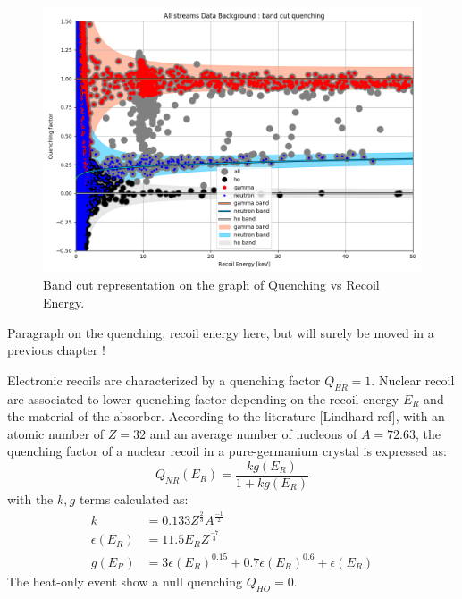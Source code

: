 \begin{figure}
\centering
\includegraphics[width=\linewidth,]{Figures/Neutron/band_cut_quenching.png}
\caption{Band cut representation on the graph of Quenching vs Recoil Energy.}
\label{fig:band-cut-quenching}
\end{figure}

{\color{red} Paragraph on the quenching, recoil energy here, but will surely be moved in a previous chapter !}

Electronic recoils are characterized by a quenching factor $Q_{ER}=1$. Nuclear recoil are associated to lower quenching factor depending on the recoil energy $E_R$ and the material of the absorber. According to the literature [Lindhard ref], with an atomic number of $Z=32$ and an average number of nucleons of $A=72.63$, the quenching factor of a nuclear recoil in a pure-germanium crystal is expressed as:
\begin{equation}
\label{eq:lindhard}
	Q_{NR}(E_R) = \frac{k g(E_R)}{1+k g(E_R)}
\end{equation}
with the $k,g$ terms calculated as:
\begin{align}
	k &= 0.133 Z^\frac{2}{3} A^\frac{-1}{2} \\
	\epsilon(E_R) &= 11.5 E_R Z^\frac{-7}{3} \\
	g(E_R) &= 3 \epsilon(E_R)^{0.15} + 0.7 \epsilon(E_R)^{0.6} + \epsilon(E_R) 
\end{align}
The heat-only event show a null quenching $Q_{HO}=0$.

